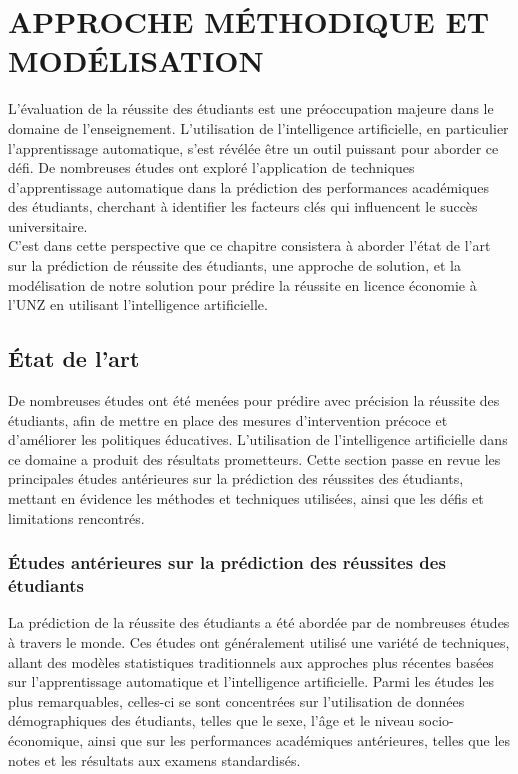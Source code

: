 \chapter{APPROCHE MÉTHODIQUE ET MODÉLISATION}
\begin{spacing}{1.2}
\minitoc
\thispagestyle{MyStyle}
\end{spacing}
\newpage

L’évaluation de la réussite des étudiants est une préoccupation majeure dans le domaine de l’enseignement. L'utilisation de l'intelligence artificielle, en particulier l'apprentissage automatique, s'est révélée être un outil puissant pour aborder ce défi. De nombreuses études ont exploré l'application de techniques d'apprentissage automatique dans la prédiction des performances académiques des étudiants, cherchant à identifier les facteurs clés qui influencent le succès universitaire. \\
C'est dans cette perspective que ce chapitre consistera à aborder l'état de l'art sur la prédiction de réussite des étudiants, une approche de solution, et la modélisation de notre solution pour prédire la réussite en licence économie à l'UNZ en utilisant l'intelligence artificielle.

\section{État de l'art}
De nombreuses études ont été menées pour prédire avec précision la réussite des étudiants, afin de mettre en place des mesures d'intervention précoce et d'améliorer les politiques éducatives. L'utilisation de l’intelligence artificielle dans ce domaine a produit des résultats prometteurs. Cette section passe en revue les principales études antérieures sur la prédiction des réussites des étudiants, mettant en évidence les méthodes et techniques utilisées, ainsi que les défis et limitations rencontrés.

\subsection{Études antérieures sur la prédiction des réussites des étudiants}
La prédiction de la réussite des étudiants a été abordée par de nombreuses études à travers le monde. Ces études ont généralement utilisé une variété de techniques, allant des modèles statistiques traditionnels aux approches plus récentes basées sur l'apprentissage automatique et l'intelligence artificielle. Parmi les études les plus remarquables, celles-ci se sont concentrées sur l'utilisation de données démographiques des étudiants, telles que le sexe, l'âge et le niveau socio-économique, ainsi que sur les performances académiques antérieures, telles que les notes et les résultats aux examens standardisés.

